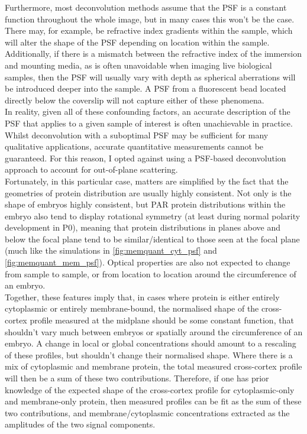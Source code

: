 \documentclass[12pt]{"report"}
\begin{document}
Furthermore, most deconvolution methods assume that the PSF is a constant function throughout the whole image, but in many cases this won't be the case. There may, for example, be refractive index gradients within the sample, which will alter the shape of the PSF depending on location within the sample. Additionally, if there is a mismatch between the refractive index of the immersion and mounting media, as is often unavoidable when imaging live biological samples, then the PSF will usually vary with depth as spherical aberrations will be introduced deeper into the sample. A PSF from a fluorescent bead located directly below the coverslip will not capture either of these phenomena.\\

In reality, given all of these confounding factors, an accurate description of the PSF that applies to a given sample of interest is often unachievable in practice. Whilst deconvolution with a suboptimal PSF may be sufficient for many qualitative applications, accurate quantitative measurements cannot be guaranteed. For this reason, I opted against using a PSF-based deconvolution approach to account for out-of-plane scattering.\\

Fortunately, in this particular case, matters are simplified by the fact that the geometries of protein distribution are usually highly consistent. Not only is the shape of embryos highly consistent, but PAR protein distributions within the embryo also tend to display rotational symmetry (at least during normal polarity development in P0), meaning that protein distributions in planes above and below the focal plane tend to be similar/identical to those seen at the focal plane (much like the simulations in \cref{fig:memquant_cyt_psf} and \cref{fig:memquant_mem_psf}). Optical properties are also not expected to change from sample to sample, or from location to location around the circumference of an embryo.\\

Together, these features imply that, in cases where protein is either entirely cytoplasmic or entirely membrane-bound, the normalised shape of the cross-cortex profile measured at the midplane should be some constant function, that shouldn't vary much between embryos or spatially around the circumference of an embryo. A change in local or global concentrations should amount to a rescaling of these profiles, but shouldn't change their normalised shape. Where there is a mix of cytoplasmic and membrane protein, the total measured cross-cortex profile will then be a sum of these two contributions. Therefore, if one has prior knowledge of the expected shape of the cross-cortex profile for cytoplasmic-only and membrane-only protein, then measured profiles can be fit as the sum of these two contributions, and membrane/cytoplasmic concentrations extracted as the amplitudes of the two signal components.\\
\end{document}
